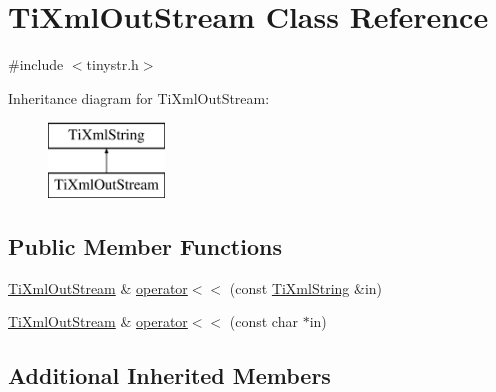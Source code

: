 \hypertarget{class_ti_xml_out_stream}{\section{Ti\-Xml\-Out\-Stream Class Reference}
\label{class_ti_xml_out_stream}
}


{\ttfamily \#include $<$tinystr.\-h$>$}

Inheritance diagram for Ti\-Xml\-Out\-Stream\-:\begin{figure}[H]
\begin{center}
\leavevmode
\includegraphics[height=2.000000cm]{class_ti_xml_out_stream}
\end{center}
\end{figure}
\subsection*{Public Member Functions}
\begin{DoxyCompactItemize}
\item 
\hyperlink{class_ti_xml_out_stream}{Ti\-Xml\-Out\-Stream} \& \hyperlink{class_ti_xml_out_stream_a3640dcb1c0903be3bc6966cdc9a79db6}{operator$<$$<$} (const \hyperlink{class_ti_xml_string}{Ti\-Xml\-String} \&in)
\item 
\hyperlink{class_ti_xml_out_stream}{Ti\-Xml\-Out\-Stream} \& \hyperlink{class_ti_xml_out_stream_af2117e5a8cbfcb69544804ad2859bfb6}{operator$<$$<$} (const char $\ast$in)
\end{DoxyCompactItemize}
\subsection*{Additional Inherited Members}


